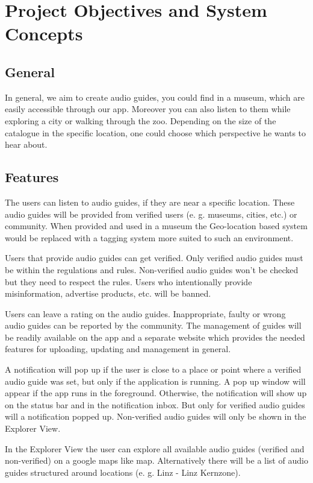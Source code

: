 \documentclass[12pt]{article}
\theoremstyle{definition}
\newenvironment{text}{
}{}
\begin{document}
\pagebreak
 
\section{Project Objectives and System Concepts}
 
\subsection{General}
\begin{text}
In general, we aim to create audio guides, you could find in a museum, which are easily accessible through our app. Moreover you can also listen to them while exploring a city or walking through the zoo.
Depending on the size of the catalogue in the specific location, one could choose which perspective he wants to hear about.
\end{text}
 
\subsection{Features}
\begin{text}
The users can listen to audio guides, if they are near a specific location. These audio guides will be provided from verified users (e. g. museums, cities, etc.) or community. 
When provided and used in a museum the Geo-location based system would be replaced with a tagging system more suited to such an environment.\newline
 
Users that provide audio guides can get verified. Only verified audio guides must be within the regulations and rules. Non-verified audio guides won’t be checked but they need to respect the rules. Users who intentionally provide misinformation, advertise products, etc. will be banned.\newline
 
Users can leave a rating on the audio guides. Inappropriate, faulty or wrong audio guides can be reported by the community. The management of guides will be readily available on the app and a separate website which provides the needed features for uploading, updating and management in general.\newline
 
A notification will pop up if the user is close to a place or point where a verified audio guide was set, but only if the application is running. A pop up window will appear if the app runs in the foreground. Otherwise, the notification will show up on the status bar and in the notification inbox. But only for verified audio guides will a notification popped up. Non-verified audio guides will only be shown in the Explorer View.\newline
 
In the Explorer View the user can explore all available audio guides (verified and non-verified) on a google maps like map. Alternatively there will be a list of audio guides structured around locations (e. g. Linz - Linz Kernzone).
\end{text}
\end{document}
